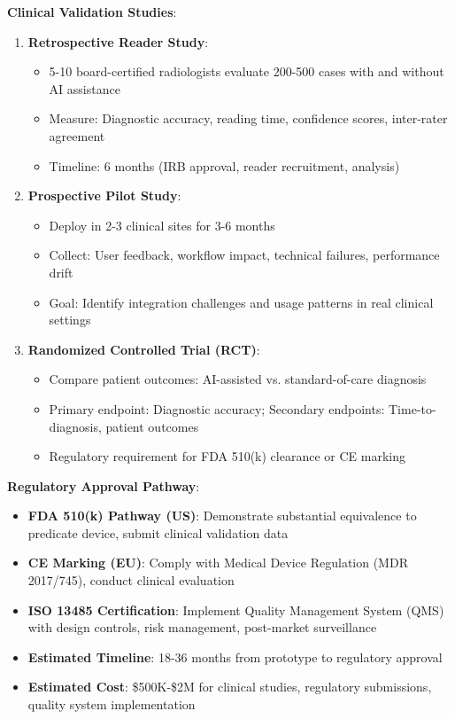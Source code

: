 \documentclass[12pt,a4paper]{article}
\begin{document}
\textbf{Clinical Validation Studies}:
\begin{enumerate}
    \item \textbf{Retrospective Reader Study}: 
    \begin{itemize}
        \item 5-10 board-certified radiologists evaluate 200-500 cases with and without AI assistance
        \item Measure: Diagnostic accuracy, reading time, confidence scores, inter-rater agreement
        \item Timeline: 6 months (IRB approval, reader recruitment, analysis)
    \end{itemize}
    
    \item \textbf{Prospective Pilot Study}:
    \begin{itemize}
        \item Deploy in 2-3 clinical sites for 3-6 months
        \item Collect: User feedback, workflow impact, technical failures, performance drift
        \item Goal: Identify integration challenges and usage patterns in real clinical settings
    \end{itemize}
    
    \item \textbf{Randomized Controlled Trial (RCT)}:
    \begin{itemize}
        \item Compare patient outcomes: AI-assisted vs. standard-of-care diagnosis
        \item Primary endpoint: Diagnostic accuracy; Secondary endpoints: Time-to-diagnosis, patient outcomes
        \item Regulatory requirement for FDA 510(k) clearance or CE marking
    \end{itemize}
\end{enumerate}

\textbf{Regulatory Approval Pathway}:
\begin{itemize}
    \item \textbf{FDA 510(k) Pathway (US)}: Demonstrate substantial equivalence to predicate device, submit clinical validation data
    \item \textbf{CE Marking (EU)}: Comply with Medical Device Regulation (MDR 2017/745), conduct clinical evaluation
    \item \textbf{ISO 13485 Certification}: Implement Quality Management System (QMS) with design controls, risk management, post-market surveillance
    \item \textbf{Estimated Timeline}: 18-36 months from prototype to regulatory approval
    \item \textbf{Estimated Cost}: \$500K-\$2M for clinical studies, regulatory submissions, quality system implementation
\end{itemize}
\end{document}
